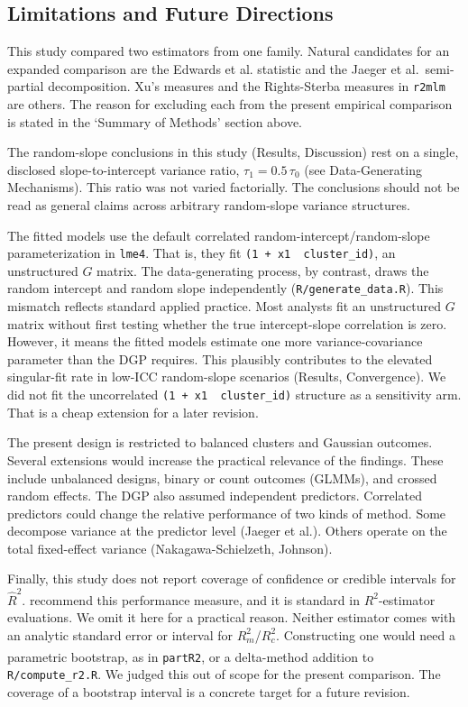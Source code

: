 \documentclass[
  11pt,
]{article}
\begin{document}
\subsection{Limitations and Future Directions}\label{limitations-and-future-directions}

This study compared two estimators from one family. Natural
candidates for an expanded comparison are the Edwards et al.
statistic and the Jaeger et al.~semi-partial decomposition. Xu's
measures and the Rights-Sterba measures in \texttt{r2mlm} are others. The
reason for excluding each from the present empirical comparison
is stated in the `Summary of Methods' section above.

The random-slope conclusions in this study (Results, Discussion)
rest on a single, disclosed slope-to-intercept variance ratio,
\(\tau_1 = 0.5\,\tau_0\) (see Data-Generating Mechanisms). This
ratio was not varied factorially. The conclusions should not be
read as general claims across arbitrary random-slope variance
structures.

The fitted models use the default correlated
random-intercept/random-slope parameterization in \texttt{lme4}. That
is, they fit \texttt{(1\ +\ x1\ \textbar{}\ cluster\_id)}, an unstructured \(G\) matrix.
The data-generating process, by contrast, draws the random
intercept and random slope independently (\texttt{R/generate\_data.R}).
This mismatch reflects standard applied practice. Most analysts
fit an unstructured \(G\) matrix without first testing whether the
true intercept-slope correlation is zero. However, it means the
fitted models estimate one more variance-covariance parameter
than the DGP requires. This plausibly contributes to the elevated
singular-fit rate in low-ICC random-slope scenarios (Results,
Convergence). We did not fit the uncorrelated
\texttt{(1\ +\ x1\ \textbar{}\textbar{}\ cluster\_id)} structure as a sensitivity arm. That is a
cheap extension for a later revision.

The present design is restricted to balanced clusters and
Gaussian outcomes. Several extensions would increase the
practical relevance of the findings. These include unbalanced
designs, binary or count outcomes (GLMMs), and crossed random
effects. The DGP also assumed independent predictors. Correlated
predictors could change the relative performance of two kinds of
method. Some decompose variance at the predictor level (Jaeger et
al.). Others operate on the total fixed-effect variance
(Nakagawa-Schielzeth, Johnson).

Finally, this study does not report coverage of confidence or
credible intervals for \(\hat{R}^2\).\textsuperscript{} recommend this performance
measure, and it is standard in \(R^2\)-estimator evaluations. We
omit it here for a practical reason. Neither estimator comes with
an analytic standard error or interval for \(R^2_m\)/\(R^2_c\).
Constructing one would need a parametric bootstrap, as in
\texttt{partR2}\textsuperscript{}, or a delta-method
addition to \texttt{R/compute\_r2.R}. We judged this out of scope for the
present comparison. The coverage of a bootstrap interval is a
concrete target for a future revision.
\end{document}
